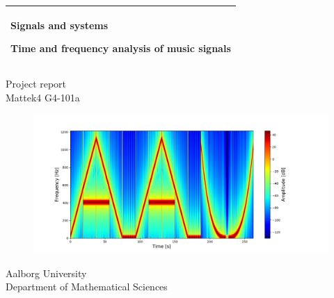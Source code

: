 %
%
%
%
%
\begin{titlepage}
  \addtolength{\hoffset}{0.5\evensidemargin-0.5\oddsidemargin} %
  \noindent%
  \begin{tabular}{@{}p{\textwidth}@{}}
    \toprule[2pt]
    \midrule
    \vspace{0.2cm}
    \begin{center}
    \Huge{\textbf{
      Signals and systems
    }}
    \end{center}
    \begin{center}
      \Large{
        Time and frequency analysis of music signals %
      }
    \end{center}
    \vspace{0.2cm}\\
    \midrule
    \toprule[2pt]
  \end{tabular}
  \begin{center}
    {\large
      Project report
    }\\
    \vspace{0.2cm}
    {\Large
      Mattek4 G4-101a
    }
  \end{center}


\begin{figure}[H]
\centering
\hspace*{-2cm}
\includegraphics[width=1.4\textwidth]{figures/aaulogo.png}
\end{figure}

  \begin{center}
  Aalborg University\\
  Department of Mathematical Sciences
  \end{center}
\end{titlepage}
\clearpage
